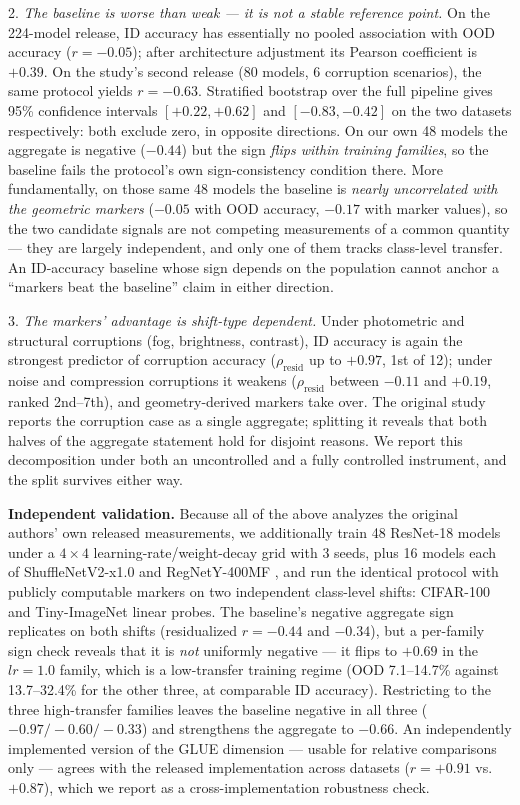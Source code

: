 \documentclass[10pt]{article} %
\begin{document}
2. \emph{The baseline is worse than weak --- it is not a stable reference point.} On the 224-model release, ID accuracy has essentially no pooled association with OOD accuracy ($r=-0.05$); after architecture adjustment its Pearson coefficient is $+0.39$. On the study's second release (80 models, 6 corruption scenarios), the same protocol yields $r=-0.63$. Stratified bootstrap over the full pipeline gives 95\% confidence intervals $[+0.22, +0.62]$ and $[-0.83, -0.42]$ on the two datasets respectively: both exclude zero, in opposite directions. On our own 48 models the aggregate is negative ($-0.44$) but the sign \emph{flips within training families}, so the baseline fails the protocol's own sign-consistency condition there. More fundamentally, on those same 48 models the baseline is \emph{nearly uncorrelated with the geometric markers} ($-0.05$ with OOD accuracy, $-0.17$ with marker values), so the two candidate signals are not competing measurements of a common quantity --- they are largely independent, and only one of them tracks class-level transfer. An ID-accuracy baseline whose sign depends on the population cannot anchor a ``markers beat the baseline'' claim in either direction.

3. \emph{The markers' advantage is shift-type dependent.} Under photometric and structural corruptions (fog, brightness, contrast), ID accuracy is again the strongest predictor of corruption accuracy ($\rho_{\text{resid}}$ up to $+0.97$, 1st of 12); under noise and compression corruptions it weakens ($\rho_{\text{resid}}$ between $-0.11$ and $+0.19$, ranked 2nd--7th), and geometry-derived markers take over. The original study reports the corruption case as a single aggregate; splitting it reveals that both halves of the aggregate statement hold for disjoint reasons. We report this decomposition under both an uncontrolled and a fully controlled instrument, and the split survives either way.

\textbf{Independent validation.} Because all of the above analyzes the original authors' own released measurements, we additionally train 48 ResNet-18 models under a $4\times4$ learning-rate/weight-decay grid with 3 seeds, plus 16 models each of ShuffleNetV2-x1.0 \citep{ma2018shufflenet} and RegNetY-400MF \citep{radosavovic2020designing}, and run the identical protocol with publicly computable markers on two independent class-level shifts: CIFAR-100 and Tiny-ImageNet \citep{le2015tiny} linear probes. The baseline's negative aggregate sign replicates on both shifts (residualized $r = -0.44$ and $-0.34$), but a per-family sign check reveals that it is \emph{not} uniformly negative --- it flips to $+0.69$ in the $lr=1.0$ family, which is a low-transfer training regime (OOD 7.1--14.7\% against 13.7--32.4\% for the other three, at comparable ID accuracy). Restricting to the three high-transfer families leaves the baseline negative in all three ($-0.97/-0.60/-0.33$) and strengthens the aggregate to $-0.66$. An independently implemented version of the GLUE dimension --- usable for relative comparisons only --- agrees with the released implementation across datasets ($r = +0.91$ vs.\ $+0.87$), which we report as a cross-implementation robustness check.
\end{document}

